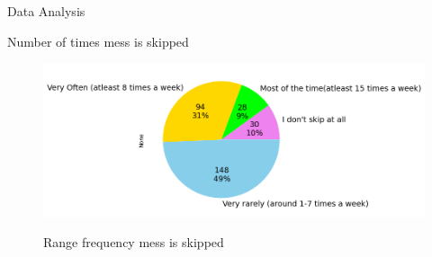 \documentclass{beamer}
\begin{document}
\begin{frame}{Data Analysis}
\begin{block}{Number of times mess is skipped}
\begin{figure}
      \centering
    \caption{Range frequency mess is skipped }
    \includegraphics[scale = 0.55]{pie_skip_categoty.png}  
    \label{pie_skip}
\end{figure}
\end{block}
\end{frame}
\end{document}
